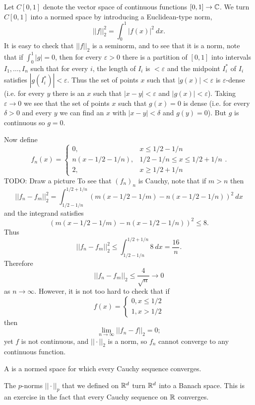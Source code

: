 \begin{example}
Let $C[0, 1]$ denote the vector space of continuous functions $[0, 1] \to \mathbb{C}$.
We turn $C[0, 1]$ into a normed space by introducing a Euclidean-type norm,
\[||f||_2^2 = \int_0^1 |f(x)|^2 ~dx.\]
It is easy to check that $||f||_2$ is a seminorm, and to see that it is a norm, note that if $\int_0^1 |g| = 0$, then for every $\varepsilon > 0$ there is a partition of $[0, 1]$ into intervals $I_1, \dots, I_{n}$ such that for every $i$, the length of $I_i$ is $<\varepsilon$ and the midpoint $I_i^*$ of $I_i$ satisfies $|g(I_i^*)| < \varepsilon$.
Thus the set of points $x$ such that $|g(x)| < \varepsilon$ is $\varepsilon$-dense (i.e. for every $y$ there is an $x$ such that $|x - y| < \varepsilon$ and $|g(x)| < \varepsilon$).
Taking $\varepsilon \to 0$ we see that the set of points $x$ such that $g(x) = 0$ is dense (i.e. for every $\delta > 0$ and every $y$ we can find an $x$ with $|x - y| < \delta$ and $g(y) = 0$).
But $g$ is continuous so $g = 0$.

Now define
$$f_{n}(x) = \begin{cases}
0, &x \leq 1/2 - 1/n\\
n(x - 1/2 - 1/n), &1/2 - 1/n \leq x \leq 1/2 + 1/n\\
2, &x \geq 1/2 + 1/n
\end{cases}.$$
TODO: Draw a picture
To see that $(f_{n})_{n}$ is Cauchy, note that if $m > n$ then
\[||f_{n} - f_{m}||_2^2 = \int_{1/2-1/n}^{1/2+1/n} (m(x - 1/2 - 1/m) - n(x - 1/2 - 1/n))^2~dx\]
and the integrand satisfies
\[(m(x - 1/2 - 1/m) - n(x - 1/2 - 1/n))^2 \leq 8.\]
Thus
\[||f_{n} - f_{m}||_2^2 \leq \int_{1/2-1/n}^{1/2+1/n} 8~dx = \frac{16}{n}.\]
Therefore
\[||f_{n} - f_{m}||_2 \leq \frac{4}{\sqrt n} \to 0\]
as $n \to \infty$. However, it is not too hard to check that if
$$f(x) = \begin{cases}
0, x \leq 1/2\\
1, x > 1/2
\end{cases}$$
then
\[\lim_{n \to \infty} ||f_{n} - f||_2 = 0;\]
yet $f$ is not continuous, and $||\cdot||_2$ is a norm, so $f_{n}$ cannot converge to any continuous function.
\end{example}

\begin{definition}
A  is a normed space for which every Cauchy sequence converges.
\end{definition}

\begin{example}
The $p$-norms $||\cdot||_{p} $ that we defined on $\mathbb{R}^d$ turn $\mathbb{R}^d$ into a Banach space.
This is an exercise in the fact that every Cauchy sequence on $\mathbb{R}$ converges.
\end{example}

